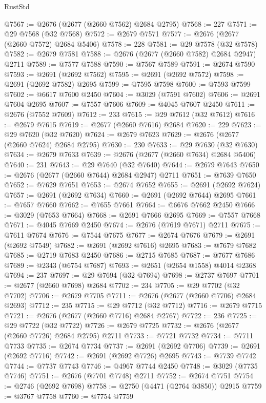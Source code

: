 \begin{lexlean}{RustStd}
\begin{coremodule}
@7567 := @2676 (@2677 (@2660 @7562) @2684 @2795)
@7568 := 227
@7571 := @29 @7568 (@32 @7568)
@7572 := @2679 @7571
@7577 := @2676 (@2677 (@2660 @7572) @2684 @5406)
@7578 := 228
@7581 := @29 @7578 (@32 @7578)
@7582 := @2679 @7581
@7588 := @2676 (@2677 (@2660 @7582) @2684 @2947) @2711
@7589 := @7577 @7588
@7590 := @7567 @7589
@7591 := @2674 @7590
@7593 := @2691 (@2692 @7562)
@7595 := @2691 (@2692 @7572)
@7598 := @2691 (@2692 @7582) @2695
@7599 := @7595 @7598
@7600 := @7593 @7599
@7602 := @6617 @7600 @2450
@7604 := @3029 (@7591 @7602)
@7606 := @2691 @7604 @2695
@7607 := @7557 @7606
@7609 := @4045 @7607 @2450
@7611 := @2676 (@7552 @7609)
@7612 := 233
@7615 := @29 @7612 (@32 @7612)
@7616 := @2679 @7615
@7619 := @2677 (@2660 @7616) @2684
@7620 := 229
@7623 := @29 @7620 (@32 @7620)
@7624 := @2679 @7623
@7629 := @2676 (@2677 (@2660 @7624) @2684 @2795)
@7630 := 230
@7633 := @29 @7630 (@32 @7630)
@7634 := @2679 @7633
@7639 := @2676 (@2677 (@2660 @7634) @2684 @5406)
@7640 := 231
@7643 := @29 @7640 (@32 @7640)
@7644 := @2679 @7643
@7650 := @2676 (@2677 (@2660 @7644) @2684 @2947) @2711
@7651 := @7639 @7650
@7652 := @7629 @7651
@7653 := @2674 @7652
@7655 := @2691 (@2692 @7624)
@7657 := @2691 (@2692 @7634)
@7660 := @2691 (@2692 @7644) @2695
@7661 := @7657 @7660
@7662 := @7655 @7661
@7664 := @6676 @7662 @2450
@7666 := @3029 (@7653 @7664)
@7668 := @2691 @7666 @2695
@7669 := @7557 @7668
@7671 := @4045 @7669 @2450
@7674 := @2676 (@7619 @7671) @2711
@7675 := @7611 @7674
@7676 := @7544 @7675
@7677 := @2674 @7676
@7679 := @2691 (@2692 @7549)
@7682 := @2691 (@2692 @7616) @2695
@7683 := @7679 @7682
@7685 := @2719 @7683 @2450
@7686 := @2715 @7685
@7687 := @7677 @7686
@7689 := @2343 (@6754 @7687)
@7693 := @2651 (@2654 @1558) @4014 @2368
@7694 := 237
@7697 := @29 @7694 (@32 @7694)
@7698 := @2737 @7697
@7701 := @2677 (@2660 @7698) @2684
@7702 := 234
@7705 := @29 @7702 (@32 @7702)
@7706 := @2679 @7705
@7711 := @2676 (@2677 (@2660 @7706) @2684 @2693)
@7712 := 235
@7715 := @29 @7712 (@32 @7712)
@7716 := @2679 @7715
@7721 := @2676 (@2677 (@2660 @7716) @2684 @2767)
@7722 := 236
@7725 := @29 @7722 (@32 @7722)
@7726 := @2679 @7725
@7732 := @2676 (@2677 (@2660 @7726) @2684 @2795) @2711
@7733 := @7721 @7732
@7734 := @7711 @7733
@7735 := @2674 @7734
@7737 := @2691 (@2692 @7706)
@7739 := @2691 (@2692 @7716)
@7742 := @2691 (@2692 @7726) @2695
@7743 := @7739 @7742
@7744 := @7737 @7743
@7746 := @4967 @7744 @2450
@7748 := @3029 (@7735 @7746)
@7751 := @2676 (@7701 @7748) @2711
@7752 := @2674 @7751
@7754 := @2746 (@2692 @7698)
@7758 := @2750 (@4471 (@2764 @3850)) @2915
@7759 := @3767 @7758
@7760 := @7754 @7759

\end{coremodule}
\end{lexlean}
